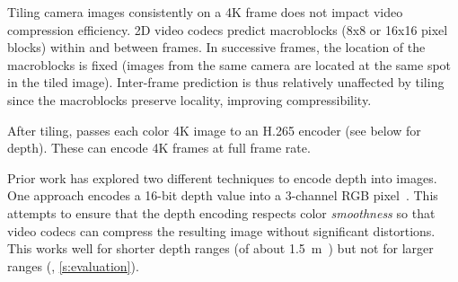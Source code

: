 Tiling camera images consistently on a 4K frame does not impact video compression efficiency.
%
2D video codecs predict macroblocks (8x8 or 16x16 pixel blocks) within and between frames.
%
In successive frames, the location of the macroblocks is fixed (images from the same camera are located at the same spot in the tiled image).
%
Inter-frame prediction is thus relatively unaffected by tiling since the macroblocks preserve locality, improving compressibility.
%
%

After tiling, \livo passes each color 4K image to an H.265 encoder (see below for depth).
%
These can encode 4K frames at full frame rate.
%



%
Prior work has explored two different techniques to encode depth into images.
%
One approach encodes a 16-bit depth value into a 3-channel RGB pixel~\cite{realsense-doc, depth-kautz, vrcomm}.
%
This attempts to ensure that the depth encoding respects color \textit{smoothness} so that video codecs can compress the resulting image without significant distortions.
%
This works well for shorter depth ranges (of about 1.5~m~\cite{vrcomm}) but not for larger ranges (\cite{depth-kautz}, \cref{s:evaluation}).

